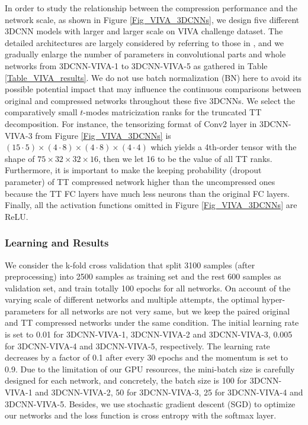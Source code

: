 \documentclass[a4paper,fleqn]{cas-dc}
\begin{document}
In order to study the relationship between the compression performance and the network scale, as shown in Figure \ref{Fig_VIVA_3DCNNs}, we design five different 3DCNN models with larger and larger scale on VIVA challenge dataset. The detailed architectures are largely considered by referring to those in \citet{Molchanov_2015_3DCNN_1}, and we gradually enlarge the number of parameters in convolutional parts and whole networks from 3DCNN-VIVA-1 to 3DCNN-VIVA-5 as gathered in Table \ref{Table_VIVA_results}. We do not use batch normalization (BN) here to avoid its possible potential impact that may influence the continuous comparisons between original and compressed networks throughout these five 3DCNNs. We select the comparatively small \(t\)-modes matricization ranks for the truncated TT decomposition. For instance, the tensorizing format of Conv2 layer in 3DCNN-VIVA-3 from Figure \ref{Fig_VIVA_3DCNNs} is \((15 \cdot 5) \times (4 \cdot 8) \times (4 \cdot 8) \times (4 \cdot 4)\) which yields a 4th-order tensor with the shape of \(75 \times 32 \times 32 \times 16\), then we let 16 to be the value of all TT ranks. Furthermore, it is important to make the keeping probability (dropout parameter) of TT compressed network higher than the uncompressed ones because the TT FC layers have much less neurons than the original FC layers. Finally, all the activation functions omitted in Figure \ref{Fig_VIVA_3DCNNs} are ReLU.

\subsubsection{Learning and Results}\quad

We consider the k-fold cross validation that split 3100 samples (after preprocessing) into 2500 samples as training set and the rest 600 samples as validation set, and train totally 100 epochs for all networks. On account of the varying scale of different networks and multiple attempts, the optimal hyper-parameters for all networks are not very same, but we keep the paired original and TT compressed networks under the same condition. The initial learning rate is set to 0.01 for 3DCNN-VIVA-1, 3DCNN-VIVA-2 and 3DCNN-VIVA-3, 0.005 for 3DCNN-VIVA-4 and 3DCNN-VIVA-5, respectively. The learning rate decreases by a factor of 0.1 after every 30 epochs and the momentum is set to 0.9. Due to the limitation of our GPU resources, the mini-batch size is carefully designed for each network, and concretely, the batch size is 100 for 3DCNN-VIVA-1 and 3DCNN-VIVA-2, 50 for 3DCNN-VIVA-3, 25 for 3DCNN-VIVA-4 and 3DCNN-VIVA-5. Besides, we use stochastic gradient descent (SGD) to optimize our networks and the loss function is cross entropy with the softmax layer.
\end{document}

